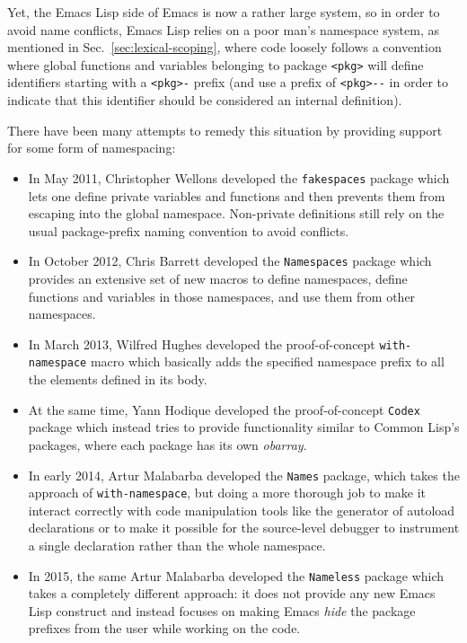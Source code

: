\documentclass[format=acmsmall, review]{acmart}
\newcommand \Elisp {Emacs Lisp}
\begin{document}
Yet, the \Elisp{} side of Emacs is now a rather large system, so in order to
avoid name conflicts, \Elisp{} relies on a poor man's namespace system, as
mentioned in Sec.~\ref{sec:lexical-scoping}, where code loosely follows
a convention where global functions and variables belonging to package
\verb|<pkg>| will define identifiers starting with a \verb|<pkg>-|
prefix (and use a prefix of \verb|<pkg>--| in order to indicate that this
identifier should be considered an internal definition).

There have been many attempts to remedy this situation by providing support
for some form of namespacing:
\begin{itemize}
\item In May 2011, Christopher Wellons developed the \texttt{fakespaces} package which
  lets one define private variables and functions and then prevents them
  from escaping into the global namespace.  Non-private definitions still
  rely on the usual package-prefix naming convention to avoid conflicts.
\item In October 2012, Chris Barrett developed the \texttt{Namespaces} package which
  provides an extensive set of new macros to define namespaces, define
  functions and variables in those namespaces, and use them from
  other namespaces.
\item In March 2013, Wilfred Hughes developed the proof-of-concept
  \texttt{with-namespace} macro which basically adds the specified namespace
  prefix to all the elements defined in its body.
\item At the same time, Yann Hodique developed the proof-of-concept \texttt{Codex}
  package which instead tries to provide functionality similar to
  Common Lisp's packages, where each package has its own \emph{obarray}.
\item In early 2014, Artur Malabarba developed the \texttt{Names} package,
  which takes the approach of \texttt{with-namespace}, but doing a more
  thorough job to make it interact correctly with code manipulation tools
  like the generator of autoload declarations or to make it possible for the
  source-level debugger to instrument a single declaration rather than the
  whole namespace.
\item In 2015, the same Artur Malabarba developed the \texttt{Nameless}
  package which
  takes a completely different approach: it does not provide any new
  \Elisp{} construct and instead focuses on making Emacs \emph{hide} the
  package prefixes from the user while working on the code.
\end{itemize}
\end{document}
